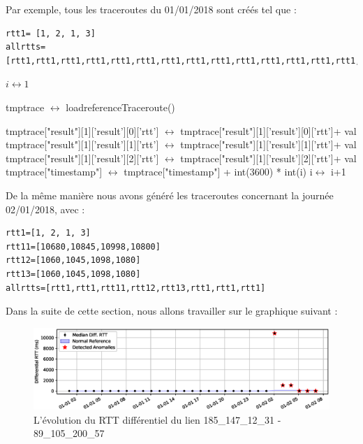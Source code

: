 Par exemple, tous les traceroutes du 01/01/2018 sont créés tel que :


\begin{lstlisting}
rtt1= [1, 2, 1, 3]
allrtts=[rtt1,rtt1,rtt1,rtt1,rtt1,rtt1,rtt1,rtt1,rtt1,rtt1,rtt1,rtt1,rtt1,rtt1,rtt1,rtt1,rtt1,rtt1,rtt1,rtt1,rtt1,rtt1,rtt1]
\end{lstlisting}

\begin{algorithm}[H]
	
	\begin{algorithmic}[1]

		\State $i   \leftrightarrow  1$
		
		        \State tmptrace $ \leftrightarrow $ loadreferenceTraceroute()
		        
		                     \State   tmptrace["result"][1]['result'][0]['rtt'] $ \leftrightarrow $ tmptrace["result"][1]['result'][0]['rtt']+ val
		                     \State   tmptrace["result"][1]['result'][1]['rtt'] $ \leftrightarrow $ tmptrace["result"][1]['result'][1]['rtt']+ val
		                     \State   tmptrace["result"][1]['result'][2]['rtt'] $ \leftrightarrow $  tmptrace["result"][1]['result'][2]['rtt']+ val
		                    \State tmptrace["timestamp"]  $ \leftrightarrow $ tmptrace["timestamp"] + int(3600) * int(i)
	     	     \EndFor
	     	     \State i$ \leftrightarrow $ i+1
		
		\EndFor

	\end{algorithmic}
	\caption{}
	\label{algo:co}
\end{algorithm}


De la même manière nous avons généré les traceroutes concernant la journée 02/01/2018, avec :
\begin{lstlisting}
rtt1=[1, 2, 1, 3]
rtt11=[10680,10845,10998,10800]
rtt12=[1060,1045,1098,1080]
rtt13=[1060,1045,1098,1080]
allrtts=[rtt1,rtt1,rtt11,rtt12,rtt13,rtt1,rtt1,rtt1]
\end{lstlisting}


Dans la suite de cette section, nous allons travailler sur le graphique suivant :

\begin{figure}
\centering
\includegraphics[width=1\linewidth]{illustrations/finalrttmodel}
\caption{L'évolution du RTT différentiel du lien 185\_147\_12\_31 - 89\_105\_200\_57}
\label{fig:finalrttmodel}
\end{figure}



